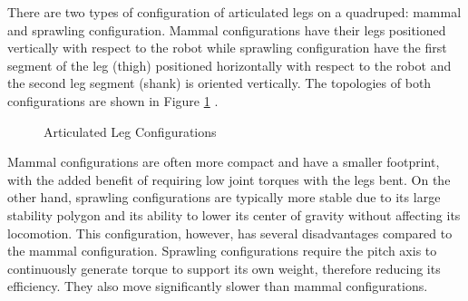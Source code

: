 \documentclass[english]{upeeei}
\begin{document}
There are two types of configuration of articulated legs on a quadruped: mammal and sprawling configuration. Mammal configurations have their legs positioned vertically with respect to the robot while sprawling configuration have the first segment of the leg (thigh) positioned horizontally with respect to the robot and the second leg segment (shank) is oriented vertically. The topologies of both configurations are shown in Figure \ref{fig:articulated-configurations} \cite{titanxiii}.

\begin{figure}[H]
\begin{centering}
\par\end{centering}
\begin{centering}
\par\end{centering}
\caption{Articulated Leg Configurations\label{fig:articulated-configurations}}
\end{figure}

Mammal configurations are often more compact and have a smaller footprint, with the added benefit of requiring low joint torques with the legs bent. On the other hand, sprawling configurations are typically more stable due to its large stability polygon and its ability to lower its center of gravity without affecting its locomotion. This configuration, however, has several disadvantages compared to the mammal configuration. Sprawling configurations require the pitch axis to continuously generate torque to support its own weight, therefore reducing its efficiency. They also move significantly slower than mammal configurations.
\end{document}
